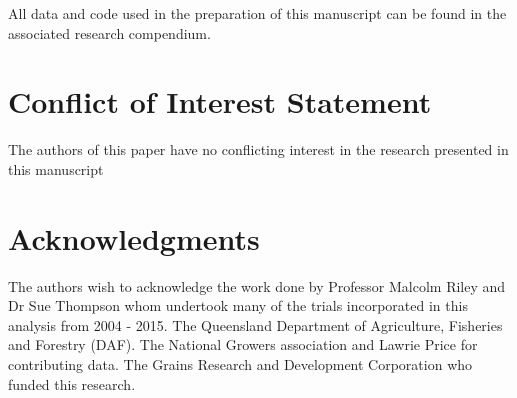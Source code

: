 \documentclass[agronomy,article,submit,moreauthors,pdftex]{mdpi}
\begin{document}
All data and code used in the preparation of this manuscript can be
found in the associated research compendium.

\hypertarget{conflict-of-interest-statement}{%
\section{Conflict of Interest
Statement}\label{conflict-of-interest-statement}}

The authors of this paper have no conflicting interest in the research
presented in this manuscript

\hypertarget{acknowledgments}{%
\section{Acknowledgments}\label{acknowledgments}}

The authors wish to acknowledge the work done by Professor Malcolm Riley
and Dr Sue Thompson whom undertook many of the trials incorporated in
this analysis from 2004 - 2015. The Queensland Department of
Agriculture, Fisheries and Forestry (DAF). The National Growers
association and Lawrie Price for contributing data. The Grains Research
and Development Corporation who funded this research.

%

\vspace{6pt}


\end{document}
